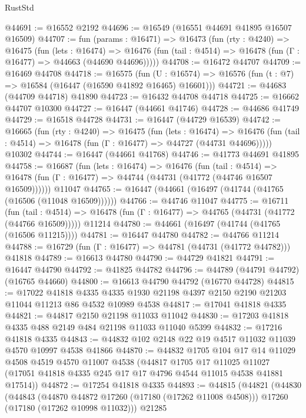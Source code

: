 \begin{lexlean}{RustStd}
\begin{coremodule}
@44691 := @16552 @2192
@44696 := @16549 (@16551 @44691 @41895 @16507 @16509)
@44707 := fun (params : @16471) =>
  @16473
    (fun (rty : @4240) =>
    @16475
      (fun (lets : @16474) =>
      @16476 (fun (tail : @4514) => @16478 (fun (Γ : @16477) => @44663 (@44690 @44696)))))
@44708 := @16472 @44707
@44709 := @16469 @44708
@44718 := @16575
    (fun (U : @16574) => @16576 (fun (t : @7) => @16584 (@16447 (@16590 @41892 @16465) @16601)))
@44721 := @44683 (@44709 @44718) @41890
@44723 := @16432 @44708 @44718
@44725 := @16662 @44707 @10300
@44727 := @16447 (@44661 @41746)
@44728 := @44686 @41749
@44729 := @16518 @44728
@44731 := @16447 (@44729 @16539)
@44742 := @16665
    (fun (rty : @4240) =>
    @16475
      (fun (lets : @16474) =>
      @16476 (fun (tail : @4514) => @16478 (fun (Γ : @16477) => @44727 (@44731 @44696)))))
    @10302
@44744 := @16447 (@44661 @41768)
@44746 := @41773 @44691 @41895
@44758 := @16687
    (fun (lets : @16474) =>
    @16476
      (fun (tail : @4514) =>
      @16478 (fun (Γ : @16477) => @44744 (@44731 (@41772 (@44746 @16507 @16509))))))
    @11047
@44765 := @16447 (@44661 (@16497 (@41744 (@41765 (@16506 (@11048 @16509))))))
@44766 := @44746 @11047
@44775 := @16711
    (fun (tail : @4514) => @16478 (fun (Γ : @16477) => @44765 (@44731 (@41772 (@44766 @16509)))))
    @11214
@44780 := @44661 (@16497 (@41744 (@41765 (@16506 @11215))))
@44781 := @16447 @44780
@44782 := @44766 @11214
@44788 := @16729 (fun (Γ : @16477) => @44781 (@44731 (@41772 @44782))) @41818
@44789 := @16613 @44780
@44790 := @44729 @41821
@44791 := @16447 @44790
@44792 := @41825 @44782
@44796 := @44789 (@44791 @44792) (@16765 @44660)
@44800 := @16613 @44790 @44792 (@16770 @44728)
@44815 := @17022
    @41818
    @4335
    @4335
    @1930
    @21198
    @4397
    @2150
    @2190
    @21203
    @11044
    @11213
    @86
    @4532
    @10989
    @4538
@44817 := @17041 @41818 @4335
@44821 := @44817 @2150 @21198 @11033 @11042
@44830 := @17203 @41818 @4335 @488 @2149 @484 @21198 @11033 @11040 @5399
@44832 := @17216 @41818 @4335
@44843 := @44832 @102 @2148 @22 @19 @4517 @11032 @11039 @4570 @10997 @4538 @41866
@44870 := @44832
    @1705
    @104
    @17
    @14
    @11029
    @4508
    @4519
    @4570
    @11007
    @4538
    (@44817
      @1705
      @17
      @11025
      @11027
      (@17051 @41818 @4335 @245 @17 @17 @4796 @4544 @11015 @4538 @41881 @17514))
@44872 := @17254 @41818 @4335
@44893 := @44815
    (@44821
      (@44830
        (@44843
          (@44870 @44872 @17260 (@17180 (@17262 @11008 @4508)))
          @17260
          (@17180 (@17262 @10998 @11032)))
        @21285

\end{coremodule}
\end{lexlean}
